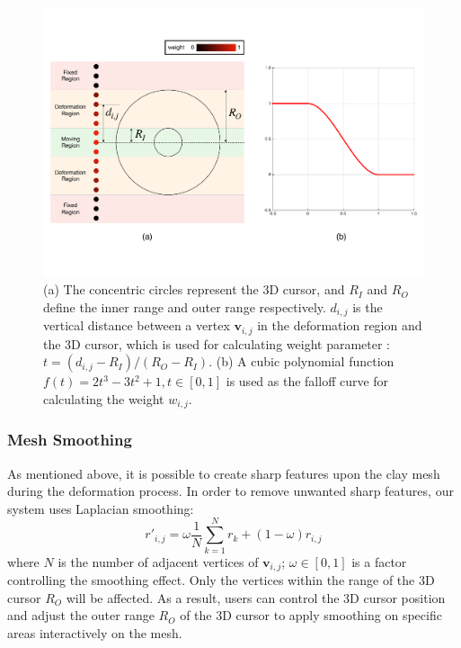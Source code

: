 \documentclass{svjour3}                     %
\begin{document}
\begin{figure}
\includegraphics[width=\textwidth]{fig8.pdf}
\caption{(a) The concentric circles represent the 3D cursor, and $R_{I}$ and $R_{O}$ define the inner range and outer range respectively. $d_{i,j}$ is the vertical distance between a vertex $\mathbf{v}_{i,j}$ in the deformation region and the 3D cursor, which is used for calculating weight parameter : $t = (d_{i,j} - R_{I}) / (R_{O} - R_{I})$. (b) A cubic polynomial function $f(t) = 2t^3 - 3t^2 + 1, t \in [0,1]$ is used as the falloff curve for calculating the weight $w_{i,j}$. }
\label{fig:deform}
\end{figure}

\subsubsection{Mesh Smoothing}
\label{sec:smoothing}
As mentioned above, it is possible to create sharp features upon the clay mesh during the deformation process. In order to remove unwanted sharp features, our system uses Laplacian smoothing:
\begin{equation}
r'_{i,j} = 
\omega  \frac{1}{N} 
\sum_{k=1}^N r_{k}
+ (1 - \omega)  r_{i,j}
\end{equation}
where $N$ is the number of adjacent vertices of $\mathbf{v}_{i,j}$; $\omega \in [0,1]$ is a factor controlling the smoothing effect.
Only the vertices within the range of the 3D cursor $R_{O}$ will be affected.
As a result, users can control the 3D cursor position and adjust the outer range $R_{O}$ of the 3D cursor to apply smoothing on specific areas interactively on the mesh.
\end{document}
